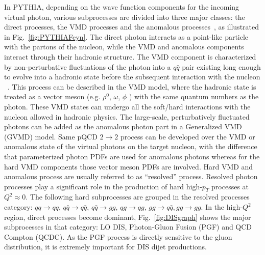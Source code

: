 In PYTHIA, depending on the wave function components for the incoming virtual
photon, various subprocesses are divided into three major classes: the direct
processes, the VMD processes and the anomalous processes~\cite{Friberg:2000ra},
as illustrated in Fig.~\ref{fig:PYTHIAFeyn}. The direct photon interacts as a
point-like particle with the partons of the nucleon, while the VMD and anomalous
components interact through their hadronic structure. The VMD component is
characterized by non-perturbative fluctuations of the photon into a $q\bar{q}$
pair existing long enough to evolve into a hadronic state before the subsequent
interaction with the nucleon ~\cite{Bauer:1977iq}. This process can be described
in the VMD model, where the hadronic state is treated as a vector meson (e.g.
$\rho^0$, $\omega$, $\phi$ ) with the same quantum numbers as the photon. These
VMD states can undergo all the soft/hard interactions with the nucleon allowed
in hadronic physics. The large-scale, perturbatively fluctuated photons can be
added as the anomalous photon part in a Generalized VMD (GVMD) model. Same pQCD
$2\rightarrow2$ process can be developed over the VMD or anomalous state of the
virtual photons on the target nucleon, with the difference that parameterized
photon PDFs are used for anomalous photons whereas for the hard VMD components
those vector meson PDFs are involved. Hard VMD and anomalous process are usually
referred to as ``resolved'' process. Resolved photon processes play a significant
role in the production of hard high-$p_{T}$ processes at $Q^{2}\approx0$. The
following hard subprocesses are grouped in the resolved processes category:
$qq\rightarrow qq, \, q\bar q \rightarrow q \bar q, \, q\bar q\rightarrow gg, \,
qg\rightarrow qg, \, gg\rightarrow q\bar q, gg\rightarrow gg$. In the
high-$Q^{2}$ region, direct processes become dominant, Fig.~\ref{fig:DISgraph}
shows the major subprocesses in that category: LO DIS, Photon-Gluon Fusion (PGF)
and QCD Compton (QCDC). As the PGF process is directly sensitive to the gluon
distribution, it is extremely important for DIS dijet productions. 


